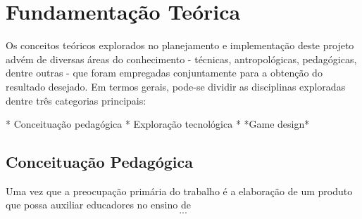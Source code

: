 
\chapter{Fundamentação Teórica}\label{cap-fundamentacao}

Os conceitos teóricos explorados no planejamento e implementação deste projeto advém de diversas áreas do conhecimento - técnicas, antropológicas, pedagógicas, dentre outras - que foram empregadas conjuntamente para a obtenção do resultado desejado. Em termos gerais, pode-se dividir as disciplinas exploradas dentre três categorias principais:

* Conceituação pedagógica
* Exploração tecnológica
* *Game design*
\section{Conceituação Pedagógica}\label{sec-fund-conceituacao-pedagogica}

Uma vez que a preocupação primária do trabalho é a elaboração de um produto que possa auxiliar educadores no ensino de \[...\]